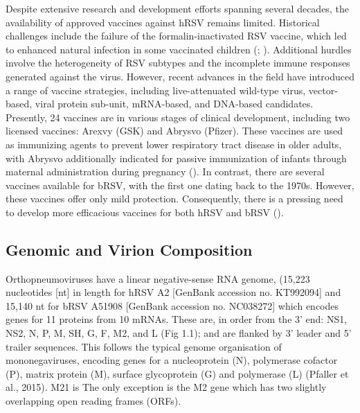 Despite extensive research and development efforts spanning several decades, the availability of approved vaccines against hRSV remains limited. Historical challenges include the failure of the formalin-inactivated RSV vaccine, which led to enhanced natural infection in some vaccinated children (\cite{Fulginiti1969RespiratoryVaccine}; \cite{Kim1969RespiratoryVaccine}). Additional hurdles involve the heterogeneity of RSV subtypes and the incomplete immune responses generated against the virus. However, recent advances in the field have introduced a range of vaccine strategies, including live-attenuated wild-type virus, vector-based, viral protein sub-unit, mRNA-based, and DNA-based candidates. Presently, 24 vaccines are in various stages of clinical development, including two licensed vaccines: Arexvy (GSK) and Abrysvo (Pfizer). These vaccines are used as immunizing agents to prevent lower respiratory tract disease in older adults, with Abrysvo additionally indicated for passive immunization of infants through maternal administration during pregnancy (\cite{Topalidou2023RespiratoryVaccines}). In contrast, there are several vaccines available for bRSV, with the first one dating back to the 1970s. However, these vaccines offer only mild protection. Consequently, there is a pressing need to develop more efficacious vaccines for both hRSV and bRSV (\cite{Ellis2017HowCattle}).

\subsection{Genomic and Virion Composition} \label{subsec:Genomic and Virion Composition}
Orthopneumoviruses have a linear negative-sense RNA genome, (15,223 nucleotides [nt] in length for hRSV A2 [GenBank accession no. KT992094] and 15,140 nt for bRSV A51908 [GenBank accession no. NC038272] which encodes genes for 11 proteins from 10 mRNAs. These are, in order from the 3' end: NS1, NS2, N, P, M, SH, G, F, M2, and L (Fig 1.1); and are flanked by 3' leader and 5' trailer sequences. This follows the typical genome organisation of mononegaviruses, encoding genes for a nucleoprotein (N), polymerase cofactor (P), matrix protein (M), surface glycoprotein (G) and polymerase (L) (Pfaller et al., 2015). M21 is The only exception is the M2 gene which has two slightly overlapping open reading frames (ORFs). 

